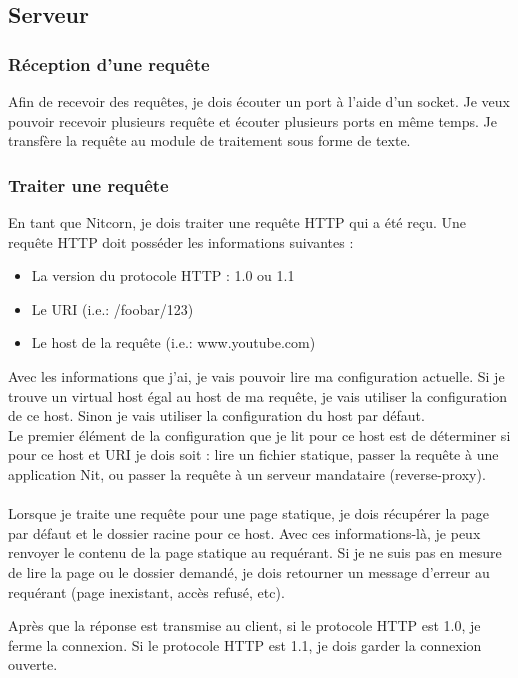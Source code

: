 \documentclass{scrreprt}
\begin{document}
\subsection{Serveur}
\subsubsection{Réception d'une requête}
Afin de recevoir des requêtes, je dois écouter un port à l'aide d'un socket. Je veux pouvoir recevoir plusieurs requête et écouter plusieurs ports en même temps. Je transfère la requête au module de traitement sous forme de texte.

\subsubsection{Traiter une requête}
En tant que Nitcorn, je dois traiter une requête HTTP qui a été reçu. Une requête
HTTP doit posséder les informations suivantes :
\begin{itemize}
    \item La version du protocole HTTP : 1.0 ou 1.1
    \item Le URI (i.e.: /foobar/123)
    \item Le host de la requête (i.e.: www.youtube.com)
\end{itemize}

Avec les informations que j'ai, je vais pouvoir lire ma configuration actuelle. Si
je trouve un virtual host égal au host de ma requête, je vais utiliser la configuration
de ce host. Sinon je vais utiliser la configuration du host par défaut. \\
Le premier élément de la configuration que je lit pour ce host est de déterminer
si pour ce host et URI je dois soit : lire un fichier statique, passer la requête
à une application Nit, ou passer la requête à un serveur mandataire (reverse-proxy).\\
\\
Lorsque je traite une requête pour une page statique, je dois récupérer la page par
défaut et le dossier racine pour ce host. Avec ces informations-là, je peux renvoyer
le contenu de la page statique au requérant. Si je ne suis pas en mesure de lire
la page ou le dossier demandé, je dois retourner un message d'erreur au requérant
(page inexistant, accès refusé, etc).

Après que la réponse est transmise au client, si le protocole HTTP est 1.0, je ferme
la connexion. Si le protocole HTTP est 1.1, je dois garder la connexion
ouverte.
\end{document}
